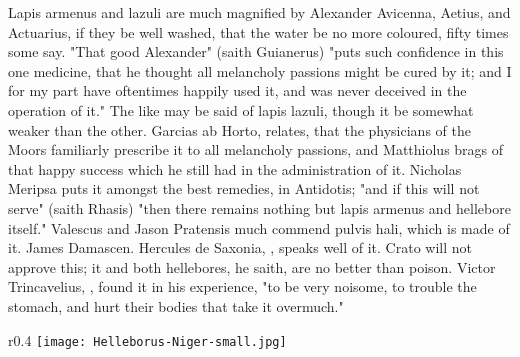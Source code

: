 {Lapis armenus and lazuli are much magnified by Alexander  Avicenna, Aetius, and Actuarius, if they be well washed, that the water be no more coloured, fifty times some say. "That good Alexander" (saith Guianerus) "puts such confidence in this one medicine, that he thought all melancholy passions might be cured by it; and I for my part have oftentimes happily used it, and was never deceived in the operation of it." The like may be said of lapis lazuli, though it be somewhat weaker than the other. Garcias ab Horto,  relates, that the physicians of the Moors familiarly prescribe it to all melancholy passions, and Matthiolus  brags of that happy success which he still had in the administration of it. Nicholas Meripsa puts it amongst the best remedies,  in Antidotis; "and if this will not serve" (saith Rhasis) "then there remains nothing but lapis armenus and hellebore itself." Valescus and Jason Pratensis much commend pulvis hali, which is made of it. James Damascen.  Hercules de Saxonia, \etc{}, speaks well of it. Crato will not approve this; it and both hellebores, he saith, are no better than poison. Victor Trincavelius, , found it in his experience, "to be very noisome, to trouble the stomach, and hurt their bodies that take it overmuch."

\begin{wrapfigure}{r}{0.4\textwidth}
  \begingroup
  \texttt{[image: Helleborus-Niger-small.jpg]}
  \label{fig:helleborusniger2}
\end{wrapfigure}

}
